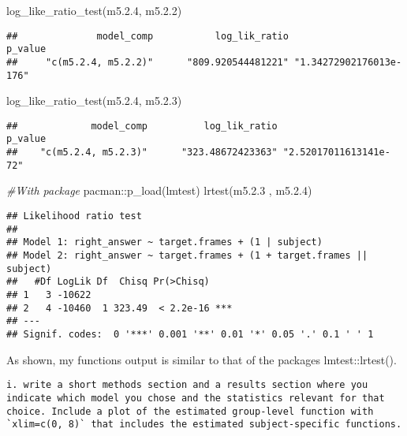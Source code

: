 \documentclass[
]{article}
\newenvironment{Shaded}{\begin{snugshade}}{\end{snugshade}}
\newcommand{\CommentTok}[1]{\textcolor[rgb]{0.56,0.35,0.01}{\textit{#1}}}
\newcommand{\FloatTok}[1]{\textcolor[rgb]{0.00,0.00,0.81}{#1}}
\newcommand{\FunctionTok}[1]{\textcolor[rgb]{0.00,0.00,0.00}{#1}}
\newcommand{\NormalTok}[1]{#1}
\newcommand{\SpecialCharTok}[1]{\textcolor[rgb]{0.00,0.00,0.00}{#1}}
\begin{document}
\begin{Shaded}
\begin{Highlighting}[]
\FunctionTok{log\_like\_ratio\_test}\NormalTok{(m5.}\FloatTok{2.4}\NormalTok{, m5.}\FloatTok{2.2}\NormalTok{)}
\end{Highlighting}
\end{Shaded}

\begin{verbatim}
##              model_comp           log_lik_ratio                 p_value 
##     "c(m5.2.4, m5.2.2)"      "809.920544481221" "1.34272902176013e-176"
\end{verbatim}

\begin{Shaded}
\begin{Highlighting}[]
\FunctionTok{log\_like\_ratio\_test}\NormalTok{(m5.}\FloatTok{2.4}\NormalTok{, m5.}\FloatTok{2.3}\NormalTok{)}
\end{Highlighting}
\end{Shaded}

\begin{verbatim}
##             model_comp          log_lik_ratio                p_value 
##    "c(m5.2.4, m5.2.3)"      "323.48672423363" "2.52017011613141e-72"
\end{verbatim}

\begin{Shaded}
\begin{Highlighting}[]
\CommentTok{\#With package}
\NormalTok{pacman}\SpecialCharTok{::}\FunctionTok{p\_load}\NormalTok{(lmtest)}
\FunctionTok{lrtest}\NormalTok{(m5.}\FloatTok{2.3}\NormalTok{ , m5.}\FloatTok{2.4}\NormalTok{)}
\end{Highlighting}
\end{Shaded}

\begin{verbatim}
## Likelihood ratio test
## 
## Model 1: right_answer ~ target.frames + (1 | subject)
## Model 2: right_answer ~ target.frames + (1 + target.frames || subject)
##   #Df LogLik Df  Chisq Pr(>Chisq)    
## 1   3 -10622                         
## 2   4 -10460  1 323.49  < 2.2e-16 ***
## ---
## Signif. codes:  0 '***' 0.001 '**' 0.01 '*' 0.05 '.' 0.1 ' ' 1
\end{verbatim}

As shown, my functions output is similar to that of the packages
lmtest::lrtest().

\begin{verbatim}
i. write a short methods section and a results section where you indicate which model you chose and the statistics relevant for that choice. Include a plot of the estimated group-level function with `xlim=c(0, 8)` that includes the estimated subject-specific functions.
\end{verbatim}
\end{document}
